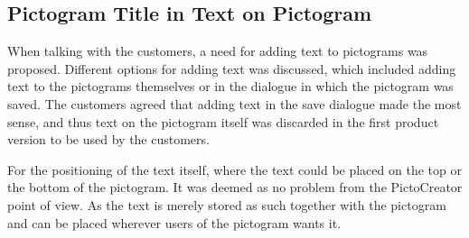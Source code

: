 \subsection{Pictogram Title in Text on Pictogram}
When talking with the customers, a need for adding text to pictograms was proposed. 
Different options for adding text was discussed, which included adding text to the pictograms themselves or in the dialogue in which the pictogram was saved.
The customers agreed that adding text in the save dialogue made the most sense, and thus text on the pictogram itself was discarded in the first product version to be used by the customers.

For the positioning of the text itself, where the text could be placed on the top or the bottom of the pictogram. It was deemed as no problem from the PictoCreator point of view. 
As the text is merely stored as such together with the pictogram and can be placed wherever users of the pictogram wants it.